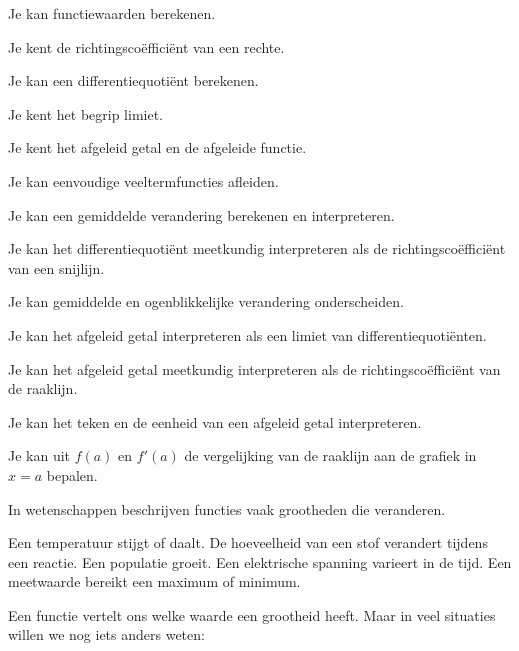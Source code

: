 \documentclass{ximera}
\begin{document}
\begin{voorkennis}
  \item Je kan functiewaarden berekenen.
  \item Je kent de richtingscoëfficiënt van een rechte.
  \item Je kan een differentiequotiënt berekenen.
  \item Je kent het begrip limiet.
  \item Je kent het afgeleid getal en de afgeleide functie.
  \item Je kan eenvoudige veeltermfuncties afleiden.
\end{voorkennis}

\begin{leerdoelen}
  \item Je kan een gemiddelde verandering berekenen en interpreteren.
  \item Je kan het differentiequotiënt meetkundig interpreteren
        als de richtingscoëfficiënt van een snijlijn.
  \item Je kan gemiddelde en ogenblikkelijke verandering onderscheiden.
  \item Je kan het afgeleid getal interpreteren als een limiet
        van differentiequotiënten.
  \item Je kan het afgeleid getal meetkundig interpreteren als
        de richtingscoëfficiënt van de raaklijn.
  \item Je kan het teken en de eenheid van een afgeleid getal
        interpreteren.
  \item Je kan uit $f(a)$ en $f'(a)$ de vergelijking van de
        raaklijn aan de grafiek in $x=a$ bepalen.
\end{leerdoelen}






In wetenschappen beschrijven functies vaak grootheden die veranderen.

Een temperatuur stijgt of daalt.
De hoeveelheid van een stof verandert tijdens een reactie.
Een populatie groeit.
Een elektrische spanning varieert in de tijd.
Een meetwaarde bereikt een maximum of minimum.

Een functie vertelt ons welke waarde een grootheid heeft.
Maar in veel situaties willen we nog iets anders weten:
\end{document}
